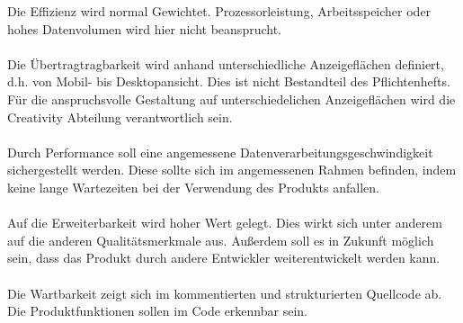     Die Effizienz wird normal Gewichtet. Prozessorleistung, Arbeitsspeicher oder hohes Datenvolumen wird hier nicht beansprucht.
    \\ \\
    Die Übertragtragbarkeit wird anhand unterschiedliche Anzeigeflächen definiert, d.h. von Mobil- bis Desktopansicht. Dies ist nicht Bestandteil des Pflichtenhefts. Für die anspruchsvolle Gestaltung auf unterschiedelichen Anzeigeflächen wird die Creativity Abteilung verantwortlich sein.
    \\ \\
    Durch Performance soll eine angemessene Datenverarbeitungsgeschwindigkeit sichergestellt werden. Diese sollte sich im angemessenen Rahmen befinden, indem keine lange Wartezeiten bei der Verwendung des Produkts anfallen.
    \\ \\
    Auf die Erweiterbarkeit wird hoher Wert gelegt. Dies wirkt sich unter anderem auf die anderen Qualitätsmerkmale aus. Außerdem soll es in Zukunft möglich sein, dass das Produkt durch andere Entwickler weiterentwickelt werden kann.
    \\ \\
    Die Wartbarkeit zeigt sich im kommentierten und strukturierten Quellcode ab. Die Produktfunktionen sollen im Code erkennbar sein.


